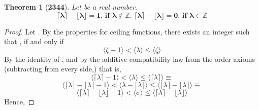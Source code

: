 \documentclass[preview]{standalone}
\newtheorem*{theorem*}{Theorem}
\begin{document}
\begin{theorem*}[\textbf{2344}]
    Let \bm{$\lambda$} be a real number.
    \begin{equation*}
        \bm{\lceil \lambda \rceil 
            - 
        \lfloor \lambda \rfloor 
            = 
        1
            \textbf{, if }
        \lambda \notin \mathbb{Z} 
            \textbf{. }
        \lceil \lambda \rceil
            - 
        \lfloor \lambda \rfloor 
            = 
        0
            \textbf{, if }
        \lambda \in \mathbb{Z}}
    \end{equation*} 
\end{theorem*}

\begin{proof}
    Let \bm{$\lambda - \lfloor \lambda \rfloor = \sigma$}.
    By the properties for ceiling functions,
    there exists an integer \bm{$\zeta$} such that
    \bm{$\lceil \lambda \rceil = \zeta$}, 
    if and only if
    \begin{equation*}
        \Big \langle \zeta - 1 \Big \rangle
            < 
        \Big \langle \lambda \Big \rangle
            \leq 
        \Big \langle \zeta \Big \rangle
    \end{equation*}
    By the identity of \bm{$\zeta$}, 
    and by the additive compatibility law from the order axioms
    (subtracting \bm{$\lfloor \lambda \rfloor$} from every side,)
    that is,
    \begin{equation*}
        \Big \langle \lceil \lambda \rceil - 1 \Big \rangle 
            <
        \Big \langle \lambda \Big \rangle
            \leq 
        \Big \langle \lceil \lambda \rceil \Big \rangle
            \equiv
    \end{equation*}
    \begin{equation*}
        \Big \langle \lceil \lambda \rceil - \lfloor \lambda \rfloor - 1 \Big \rangle
            < 
        \Big \langle \lambda - \lfloor \lambda \rfloor \Big \rangle
            \leq 
        \Big \langle \lceil \lambda \rceil - \lfloor \lambda \rfloor \Big \rangle
            \equiv
    \end{equation*}
    \begin{equation*}
        \Big \langle \lceil \lambda \rceil - \lfloor \lambda \rfloor - 1 \Big \rangle
            < 
        \Big \langle \sigma \Big \rangle
            \leq 
        \Big \langle \lceil \lambda \rceil - \lfloor \lambda \rfloor \Big \rangle
    \end{equation*}
    Hence, 
    \bm{$
        \lceil \sigma \rceil 
            = 
        \lceil \lambda \rceil - \lfloor \lambda \rceil
}
\end{proof}
\end{document}
